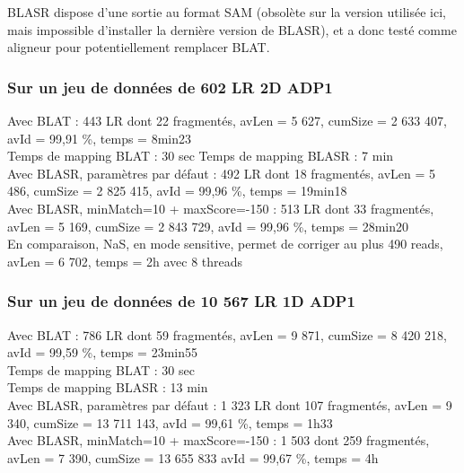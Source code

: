 \documentclass[12pt]{article}
\begin{document}
BLASR dispose d'une sortie au format SAM (obsolète sur la version utilisée ici, mais impossible d'installer la dernière version de BLASR), et a donc testé comme aligneur pour potentiellement remplacer BLAT. \\


\subsubsection{Sur un jeu de données de 602 LR 2D ADP1}

Avec BLAT : 443 LR dont 22 fragmentés, avLen = 5 627, cumSize = 2 633 407, avId = 99,91 \%, temps = 8min23 \\

Temps de mapping BLAT : 30 sec
Temps de mapping BLASR : 7 min \\

Avec BLASR, paramètres par défaut : 492 LR dont 18 fragmentés, avLen = 5 486, cumSize = 2 825 415, avId = 99,96 \%, temps = 19min18 \\

Avec BLASR, minMatch=10 + maxScore=-150 : 513 LR dont 33 fragmentés, avLen = 5 169, cumSize = 2 843 729, avId = 99,96 \%, temps = 28min20 \\

En comparaison, NaS, en mode sensitive, permet de corriger au plus 490 reads, avLen = 6 702, temps = 2h avec 8 threads \\

\subsubsection{Sur un jeu de données de 10 567 LR 1D ADP1}

Avec BLAT : 786 LR dont 59 fragmentés, avLen = 9 871, cumSize = 8 420 218, avId = 99,59 \%, temps = 23min55 \\

Temps de mapping BLAT : 30 sec \\
Temps de mapping BLASR : 13 min \\

Avec BLASR, paramètres par défaut : 1 323 LR dont 107 fragmentés, avLen = 9 340, cumSize = 13 711 143, avId = 99,61 \%, temps = 1h33 \\

Avec BLASR, minMatch=10 + maxScore=-150 : 1 503 dont 259 fragmentés, avLen = 7 390, cumSize = 13 655 833 avId = 99,67 \%, temps = 4h \\ 
\end{document}
